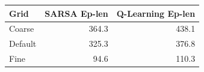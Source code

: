 \begin{tabular}{lrr}
\hline
\textbf{Grid} & \textbf{SARSA Ep-len} & \textbf{Q-Learning Ep-len} \\
\hline
Coarse & 364.3 & 438.1 \\
Default & 325.3 & 376.8 \\
Fine & 94.6 & 110.3 \\
\hline
\end{tabular}
